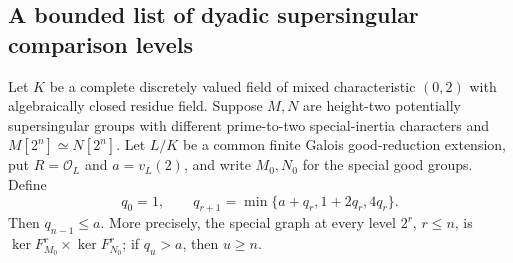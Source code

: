 \subsection{A bounded list of dyadic supersingular comparison levels}

\begin{lemma}
\label{lem:B-RD45}
Let $K$ be a complete discretely valued field of mixed characteristic
$(0,2)$ with algebraically closed residue field.
Suppose $M,N$ are height-two potentially supersingular groups with
different prime-to-two special-inertia characters and
$M[2^n]\simeq N[2^n]$. Let $L/K$ be a common finite Galois
good-reduction extension, put $R=\mathcal O_L$ and $a=v_L(2)$,
and write $M_0,N_0$ for the special good groups.
Define
\[
 q_0=1,\qquad q_{r+1}=\min\{a+q_r,1+2q_r,4q_r\}.
 \tag{B-RD45.1}
\]
Then $q_{n-1}\le a$.
More precisely, the special graph at every level $2^r$, $r\le n$,
is $\ker F_{M_0}^r\times\ker F_{N_0}^r$; if $q_u>a$, then
$u\ge n$.
\end{lemma}
